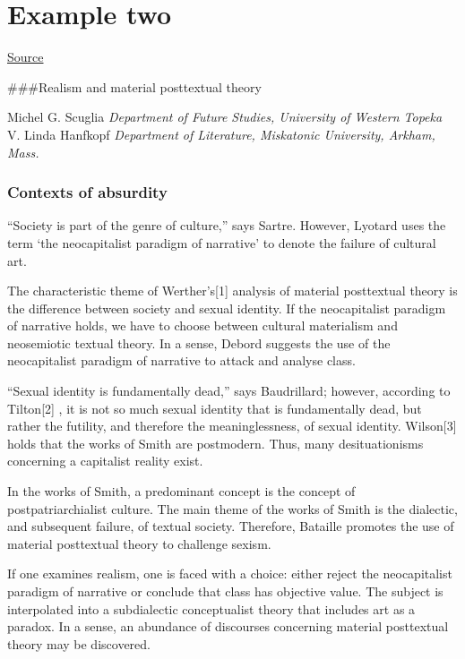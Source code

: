 \documentclass[]{book}
\begin{document}
\hypertarget{example-two}{%
\section{Example two}\label{example-two}}

\href{http://www.elsewhere.org/journal/pomo/1329856939/}{Source}

\#\#\#Realism and material posttextual theory

Michel G. Scuglia \emph{Department of Future Studies, University of
Western Topeka} V. Linda Hanfkopf \emph{Department of Literature,
Miskatonic University, Arkham, Mass.}

\hypertarget{contexts-of-absurdity}{%
\subsubsection{Contexts of absurdity}\label{contexts-of-absurdity}}

``Society is part of the genre of culture,'' says Sartre. However,
Lyotard uses the term `the neocapitalist paradigm of narrative' to
denote the failure of cultural art.

The characteristic theme of Werther's{[}1{]} analysis of material
posttextual theory is the difference between society and sexual
identity. If the neocapitalist paradigm of narrative holds, we have to
choose between cultural materialism and neosemiotic textual theory. In a
sense, Debord suggests the use of the neocapitalist paradigm of
narrative to attack and analyse class.

``Sexual identity is fundamentally dead,'' says Baudrillard; however,
according to Tilton{[}2{]} , it is not so much sexual identity that is
fundamentally dead, but rather the futility, and therefore the
meaninglessness, of sexual identity. Wilson{[}3{]} holds that the works
of Smith are postmodern. Thus, many desituationisms concerning a
capitalist reality exist.

In the works of Smith, a predominant concept is the concept of
postpatriarchialist culture. The main theme of the works of Smith is the
dialectic, and subsequent failure, of textual society. Therefore,
Bataille promotes the use of material posttextual theory to challenge
sexism.

If one examines realism, one is faced with a choice: either reject the
neocapitalist paradigm of narrative or conclude that class has objective
value. The subject is interpolated into a subdialectic conceptualist
theory that includes art as a paradox. In a sense, an abundance of
discourses concerning material posttextual theory may be discovered.
\end{document}
